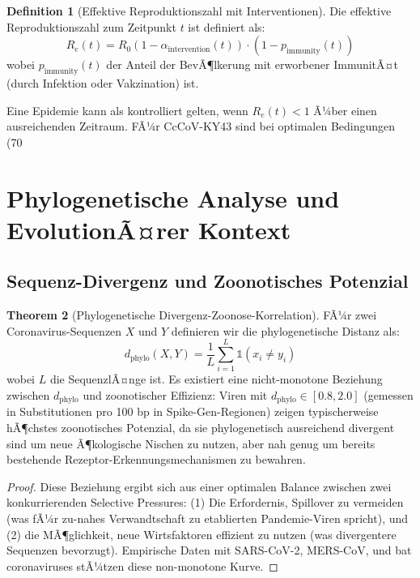 ﻿\documentclass[11pt,a4paper]{article}
\theoremstyle{definition}
\newtheorem{theorem}{Theorem}[section]
\newtheorem{definition}[theorem]{Definition}
\begin{document}
\begin{definition}[Effektive Reproduktionszahl mit Interventionen]
Die effektive Reproduktionszahl zum Zeitpunkt $t$ ist definiert als:
\[
R_e(t) = R_0 (1 - \alpha_{\text{intervention}}(t)) \cdot (1 - p_{\text{immunity}}(t))
\]
wobei $p_{\text{immunity}}(t)$ der Anteil der BevÃ¶lkerung mit erworbener ImmunitÃ¤t (durch Infektion oder Vakzination) ist.
\end{definition}

Eine Epidemie kann als kontrolliert gelten, wenn $R_e(t) < 1$ Ã¼ber einen ausreichenden Zeitraum. FÃ¼r CcCoV-KY43 sind bei optimalen Bedingungen (70%

\section{Phylogenetische Analyse und EvolutionÃ¤rer Kontext}

\subsection{Sequenz-Divergenz und Zoonotisches Potenzial}

\begin{theorem}[Phylogenetische Divergenz-Zoonose-Korrelation]
\label{thm:phylo_zoonosis}
FÃ¼r zwei Coronavirus-Sequenzen $X$ und $Y$ definieren wir die phylogenetische Distanz als:
\[
d_{\text{phylo}}(X, Y) = \frac{1}{L} \sum_{i=1}^{L} \mathbb{1}(x_i \neq y_i)
\]
wobei $L$ die SequenzlÃ¤nge ist. Es existiert eine nicht-monotone Beziehung zwischen $d_{\text{phylo}}$ und zoonotischer Effizienz: Viren mit $d_{\text{phylo}} \in [0.8, 2.0]$ (gemessen in Substitutionen pro 100 bp in Spike-Gen-Regionen) zeigen typischerweise hÃ¶chstes zoonotisches Potenzial, da sie phylogenetisch ausreichend divergent sind um neue Ã¶kologische Nischen zu nutzen, aber nah genug um bereits bestehende Rezeptor-Erkennungsmechanismen zu bewahren.
\end{theorem}

\begin{proof}
Diese Beziehung ergibt sich aus einer optimalen Balance zwischen zwei konkurrierenden Selective Pressures: (1) Die Erfordernis, Spillover zu vermeiden (was fÃ¼r zu-nahes Verwandtschaft zu etablierten Pandemie-Viren spricht), und (2) die MÃ¶glichkeit, neue Wirtsfaktoren effizient zu nutzen (was divergentere Sequenzen bevorzugt). Empirische Daten mit SARS-CoV-2, MERS-CoV, und bat coronaviruses stÃ¼tzen diese non-monotone Kurve.
\end{proof}
\end{document}
